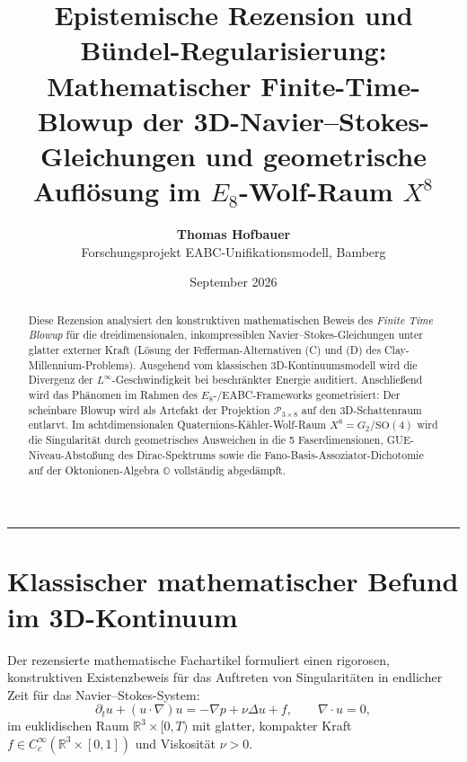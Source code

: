 \documentclass[11pt,a4paper]{article}
\theoremstyle{remark}
\begin{document}
\title{\LARGE\textbf{Epistemische Rezension und Bündel-Regularisierung:}\\[0.3em]
\Large Mathematischer Finite-Time-Blowup der 3D-Navier--Stokes-Gleichungen und geometrische Auflösung im $E_8$-Wolf-Raum $X^8$}
\author{\textbf{Thomas Hofbauer} \\
\small Forschungsprojekt EABC-Unifikationsmodell, Bamberg}
\date{September 2026}

\maketitle

\begin{abstract}
\noindent Diese Rezension analysiert den konstruktiven mathematischen Beweis des \emph{Finite Time Blowup} für die dreidimensionalen, inkompressiblen Navier--Stokes-Gleichungen unter glatter externer Kraft (Lösung der Fefferman-Alternativen (C) und (D) des Clay-Millennium-Problems). Ausgehend vom klassischen 3D-Kontinuumsmodell wird die Divergenz der $L^\infty$-Geschwindigkeit bei beschränkter Energie auditiert. Anschließend wird das Phänomen im Rahmen des $E_8$-/EABC-Frameworks geometrisiert: Der scheinbare Blowup wird als Artefakt der Projektion $\mathcal{P}_{3 \times 8}$ auf den 3D-Schattenraum entlarvt. Im achtdimensionalen Quaternions-Kähler-Wolf-Raum $X^8 = G_2/\mathrm{SO}(4)$ wird die Singularität durch geometrisches Ausweichen in die 5 Faserdimensionen, GUE-Niveau-Abstoßung des Dirac-Spektrums sowie die Fano-Basis-Assoziator-Dichotomie auf der Oktonionen-Algebra $\mathbb{O}$ vollständig abgedämpft.
\end{abstract}

\vspace{0.5em}
\hrule
\vspace{1.5em}

\section{Klassischer mathematischer Befund im 3D-Kontinuum}

Der rezensierte mathematische Fachartikel formuliert einen rigorosen, konstruktiven Existenzbeweis für das Auftreten von Singularitäten in endlicher Zeit für das Navier--Stokes-System:
\begin{equation}
\label{eq:navier_stokes}
\partial_t u + (u \cdot \nabla) u = -\nabla p + \nu \Delta u + f, \qquad \nabla \cdot u = 0,
\end{equation}
im euklidischen Raum $\mathbb{R}^3 \times [0, T)$ mit glatter, kompakter Kraft $f \in C_c^\infty(\mathbb{R}^3 \times [0, 1])$ und Viskosität $\nu > 0$.
\end{document}
